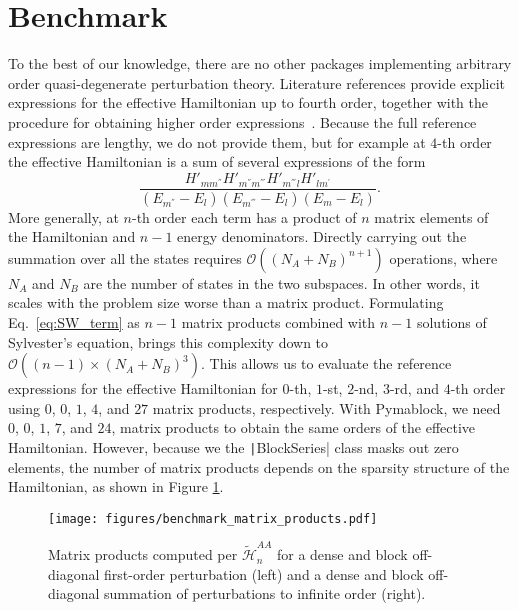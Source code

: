 \section{Benchmark}
\label{sec:benchmark}

To the best of our knowledge, there are no other packages implementing arbitrary order quasi-degenerate perturbation theory.
Literature references provide explicit expressions for the effective Hamiltonian up to fourth order, together with the procedure for obtaining higher order expressions~\cite{Winkler_2003}.
Because the full reference expressions are lengthy, we do not provide them, but for example at $4$-th order the effective Hamiltonian is a sum of several expressions of the form
\begin{equation}
\label{eq:SW_term}
\frac{H'_{mm^{''}}H'_{m^{''}m^{'''}}H'_{m^{'''}l}H'_{lm^{'}}}{(E_{m^{''}}-E_{l})(E_{m^{'''}}-E_{l})(E_{m}-E_{l})}.
\end{equation}
More generally, at $n$-th order each term has a product of $n$ matrix elements of the Hamiltonian and $n-1$ energy denominators.
Directly carrying out the summation over all the states requires $\mathcal{O}((N_A + N_B)^{n+1})$ operations, where $N_A$ and $N_B$ are the number of states in the two subspaces.
In other words, it scales with the problem size worse than a matrix product.
Formulating Eq.~\eqref{eq:SW_term} as $n-1$ matrix products combined with $n-1$ solutions
of Sylvester's equation, brings this complexity down to $\mathcal{O}((n-1) \times (N_A + N_B)^3)$.
This allows us to evaluate the reference expressions for the effective Hamiltonian for
$0$-th, $1$-st, $2$-nd, $3$-rd, and $4$-th order using $0$, $0$, $1$, $4$, and $27$ matrix products, respectively.
With Pymablock, we need $0$, $0$, $1$, $7$, and $24$, matrix products to obtain the same orders of the effective Hamiltonian.
However, because we the \texttt|BlockSeries| class masks out zero elements,
the number of matrix products depends on the sparsity structure of the Hamiltonian, as shown in Figure \ref{fig:benchmark_matrix_products}.
%
\begin{figure}[h]
    \centering
    \texttt{[image: figures/benchmark\_matrix\_products.pdf]}
    \caption{
        Matrix products computed per $\tilde{\mathcal{H}}^{AA}_{n}$ for
        a dense and block off-diagonal first-order perturbation (left) and a dense and block off-diagonal summation of perturbations to infinite order (right).
    }
    \label{fig:benchmark_matrix_products}
\end{figure}
%

